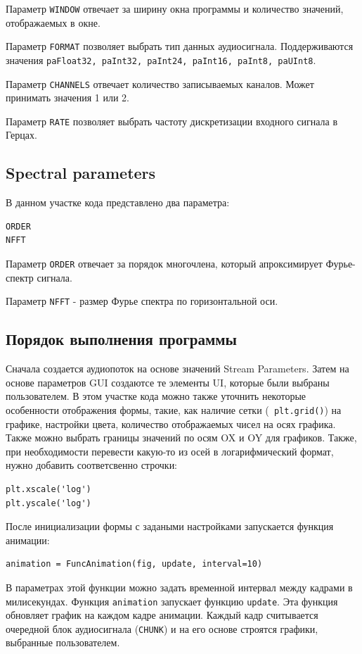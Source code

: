 Параметр \verb|WINDOW| отвечает за ширину окна программы и количество значений, отображаемых в окне.

Параметр \verb|FORMAT| позволяет выбрать тип данных аудиосигнала. Поддерживаются значения  \verb|paFloat32, paInt32, paInt24, paInt16, paInt8, paUInt8|.

Параметр \verb|CHANNELS| отвечает количество записываемых каналов. Может принимать значения 1 или 2. 

Параметр \verb|RATE| позволяет выбрать частоту дискретизации входного сигнала в Герцах.

\subsection{Spectral parameters}
В данном участке кода представлено два параметра:
\begin{verbatim}
ORDER
NFFT
\end{verbatim}
Параметр \verb|ORDER| отвечает за порядок многочлена, который апроксимирует Фурье-спектр сигнала.

Параметр \verb|NFFT| - размер Фурье спектра по горизонтальной оси.
\subsection{Порядок выполнения программы}
Сначала создается аудиопоток на основе значений Stream Parameters. Затем на основе параметров GUI создаютсе те элементы UI, которые были выбраны пользователем. В этом участке кода можно также уточнить некоторые особенности отображения формы, такие, как наличие сетки (\verb| plt.grid()|) на графике, настройки цвета, количество отображаемых чисел на осях графика. Также можно выбрать границы значений по осям OX и OY для графиков. Также, при необходимости перевести какую-то из осей в логарифмический формат, нужно добавить  соответсвенно строчки:
\begin{verbatim}
plt.xscale('log')
plt.yscale('log')
\end{verbatim}

После инициализации формы с задаными настройками запускается функция анимации: 
\begin{verbatim}
animation = FuncAnimation(fig, update, interval=10)
\end{verbatim}
В параметрах этой функции можно задать временной интервал между кадрами в милисекундах. Функция \verb|animation| запускает функцию \verb|update|. Эта функция обновляет график на каждом кадре анимации. Каждый кадр считывается очередной блок аудиосигнала (\verb|CHUNK|) и на его основе строятся графики, выбранные пользователем. 

